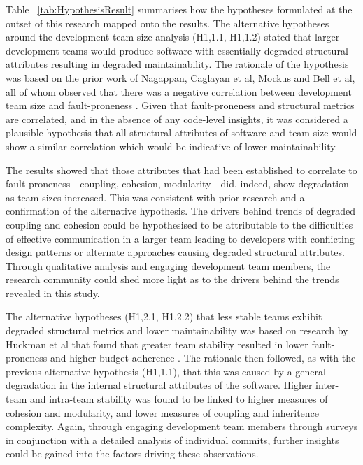 Table ~\ref{tab:HypothesisResult} summarises how the hypotheses formulated at the outset of this research mapped onto the results. The alternative hypotheses around the development team size analysis (H1,1.1, H1,1.2) stated that larger development teams would produce software with essentially degraded structural attributes resulting in degraded maintainability. The rationale of the hypothesis was based on the prior work of Nagappan, Caglayan et al, Mockus and Bell et al, all of whom observed that there was a negative correlation between development team size and fault-proneness \citep{nagappan2008influence, caglayan2015merits, mockus2010organizational, bell2013limited}. Given that fault-proneness and structural metrics are correlated, and in the absence of any code-level insights, it was considered a plausible hypothesis that all structural attributes of software and team size would show a similar correlation which would be indicative of lower maintainability. 

The results showed that those attributes that had been established to correlate to fault-proneness - coupling, cohesion, modularity - did, indeed, show degradation as team sizes increased. This was consistent with prior research and a confirmation of the alternative hypothesis. The drivers behind trends of degraded coupling and cohesion could be hypothesised to be attributable to the difficulties of effective communication in a larger team leading to developers with conflicting design patterns or alternate approaches causing degraded structural attributes. Through qualitative analysis and engaging development team members, the research community could shed more light as to the drivers behind the trends revealed in this study.

The alternative hypotheses (H1,2.1, H1,2.2) that less stable teams exhibit degraded structural metrics and lower maintainability was based on research by Huckman et al that found that greater team stability resulted in lower fault-proneness and higher budget adherence \citep{huckman2009team}. The rationale then followed, as with the previous alternative hypothesis (H1,1.1), that this was caused by a general degradation in the internal structural attributes of the software. Higher inter-team and intra-team stability was found to be linked to higher measures of cohesion and modularity, and lower measures of coupling and inheritence complexity. Again, through engaging development team members through surveys in conjunction with a detailed analysis of individual commits, further insights could be gained into the factors driving these observations.

